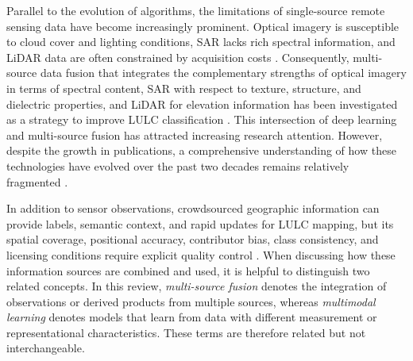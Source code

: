 \documentclass[]{interact}
\theoremstyle{plain}%
\theoremstyle{definition}
\theoremstyle{remark}
\DeclareRobustCommand{\DIFadd}[1]{{\protect\color{DIFaddcolor}\uwave{#1}}}
\DeclareRobustCommand{\DIFdel}[1]{{\protect\color{DIFdelcolor}\sout{#1}}}
\def\DIFadd#1{#1}%
\def\DIFdel#1{}%
\begin{document}
Parallel to the evolution of algorithms, the limitations of single-source remote sensing data have become increasingly prominent. Optical imagery is susceptible to cloud cover and lighting conditions, SAR lacks rich spectral information, and LiDAR data \DIFdel{is} \DIFadd{are} often constrained by acquisition costs {\color{blue}\citep{6}}. Consequently, multi-source data fusion that integrates the complementary strengths of optical imagery in terms of spectral content, SAR with respect to texture, structure, and dielectric properties, and LiDAR for elevation information has \DIFdel{become} \DIFdel{an} \DIFdel{inevitable} \DIFadd{been} \DIFadd{investigated} \DIFadd{as} \DIFadd{a} strategy to \DIFdel{overcome} \DIFdel{the} \DIFdel{accuracy} \DIFdel{limitations} \DIFdel{of} \DIFadd{improve} LULC classification {\color{blue}\citep{hong2021benchmarks}}. \DIFdel{The} \DIFadd{This} intersection of deep learning and multi-source fusion \DIFdel{now} \DIFdel{represents} \DIFadd{has} \DIFadd{attracted} \DIFadd{increasing} \DIFadd{research} \DIFadd{attention}\DIFadd{.} \DIFadd{However}\DIFadd{,} \DIFadd{despite} the \DIFdel{current} \DIFdel{technical} \DIFdel{frontier}\DIFdel{.} \DIFdel{Despite} \DIFdel{the} \DIFdel{exponential} growth in publications, a comprehensive understanding of how these technologies have evolved over the past two decades remains relatively fragmented \citep{5}\DIFadd{.}

\DIFadd{In} \DIFadd{addition} \DIFadd{to} \DIFadd{sensor} \DIFadd{observations}\DIFadd{,} \DIFadd{crowdsourced} \DIFadd{geographic} \DIFadd{information} \DIFadd{can} \DIFadd{provide} \DIFadd{labels}\DIFadd{,} \DIFadd{semantic} \DIFadd{context}\DIFadd{,} \DIFadd{and} \DIFadd{rapid} \DIFadd{updates} \DIFadd{for} \DIFadd{LULC} \DIFadd{mapping}\DIFadd{,} \DIFadd{but} \DIFadd{its} \DIFadd{spatial} \DIFadd{coverage}\DIFadd{,} \DIFadd{positional} \DIFadd{accuracy}\DIFadd{,} \DIFadd{contributor} \DIFadd{bias}\DIFadd{,} \DIFadd{class} \DIFadd{consistency}\DIFadd{,} \DIFadd{and} \DIFadd{licensing} \DIFadd{conditions} \DIFadd{require} \DIFadd{explicit} \DIFadd{quality} \DIFadd{control} {\color{blue}\citep{wu2024crowdsourced}}\DIFadd{.} \DIFadd{When} \DIFadd{discussing} \DIFadd{how} \DIFadd{these} \DIFadd{information} \DIFadd{sources} \DIFadd{are} \DIFadd{combined} \DIFadd{and} \DIFadd{used}\DIFadd{,} \DIFadd{it} \DIFadd{is} \DIFadd{helpful} \DIFadd{to} \DIFadd{distinguish} \DIFadd{two} \DIFadd{related} \DIFadd{concepts}\DIFadd{.} \DIFadd{In} \DIFadd{this} \DIFadd{review}\DIFadd{,} \emph{\DIFadd{multi-source} \DIFadd{fusion}} \DIFadd{denotes} \DIFadd{the} \DIFadd{integration} \DIFadd{of} \DIFadd{observations} \DIFadd{or} \DIFadd{derived} \DIFadd{products} \DIFadd{from} \DIFadd{multiple} \DIFadd{sources}\DIFadd{,} \DIFadd{whereas} \emph{\DIFadd{multimodal} \DIFadd{learning}} \DIFadd{denotes} \DIFadd{models} \DIFadd{that} \DIFadd{learn} \DIFadd{from} \DIFadd{data} \DIFadd{with} \DIFadd{different} \DIFadd{measurement} \DIFadd{or} \DIFadd{representational} \DIFadd{characteristics}\DIFadd{.} \DIFadd{These} \DIFadd{terms} \DIFadd{are} \DIFadd{therefore} \DIFadd{related} \DIFadd{but} \DIFadd{not} \DIFadd{interchangeable}.
\end{document}
